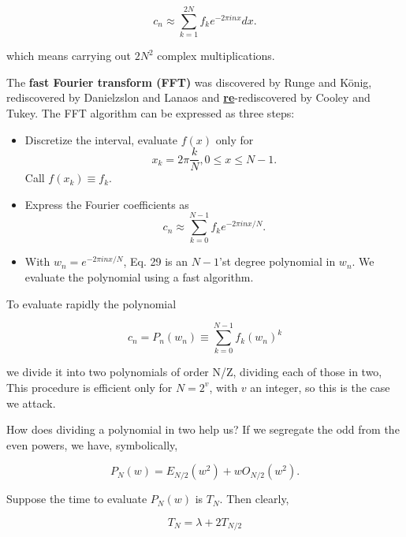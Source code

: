 \begin{equation}
c_{n} \approx \sum_{k=1}^{2N}f_{k}e^{-2\pi inx}dx .
\end{equation}

which means carrying out $2N^2$ complex multiplications.

The \textbf{fast Fourier transform (FFT)} was discovered by Runge and K\"{o}nig, rediscovered by Danielzslon and Lanaos and \textbf{\underline{re}}-rediscovered by Cooley and Tukey. The FFT algorithm can be expressed as three steps:

\begin{itemize}
    \item Discretize the interval, \ie evaluate $f(x)$ only for
    \begin{equation}
        x_{k} = 2\pi \frac{k}{N} , 0 \leq x \leq N-1.
    \end{equation}
    Call $f(x_k) \equiv f_k$.
    \item   Express the Fourier coefficients as
    \begin{equation}
        c_{n} \approx \sum_{k=0}^{N-1}f_{k}e^{-2\pi inx/N} .
    \end{equation}
    \item With $w_{n} = e^{-2\pi inx/N}$, Eq. 29 is an $N-1$’st degree polynomial in $w_{n}$. We evaluate the polynomial using a fast algorithm.
\end{itemize}

To evaluate rapidly the polynomial

\begin{equation}
c_{n} = P_{n}(w_{n}) \equiv \sum_{k=0}^{N-1}f_{k}(w_{n})^k
\end{equation}

we divide it into two polynomials of order N/Z, dividing each of those in two, \etc This procedure is efficient only for $N=2^v$, with $v$ an integer, so this is the case we attack.

How does dividing a polynomial in two help us? If we segregate the odd from the even powers, we have, symbolically,

\begin{equation}
P_{N}(w) = E_{N/2}(w^{2}) + w O_{N/2}(w^2).
\end{equation}

Suppose the time to evaluate $P_N(w)$ is $T_{N}$. Then clearly,

\begin{equation}\label{eq:08_31}
T_{N} = \lambda + 2T_{N/2}
\end{equation}

